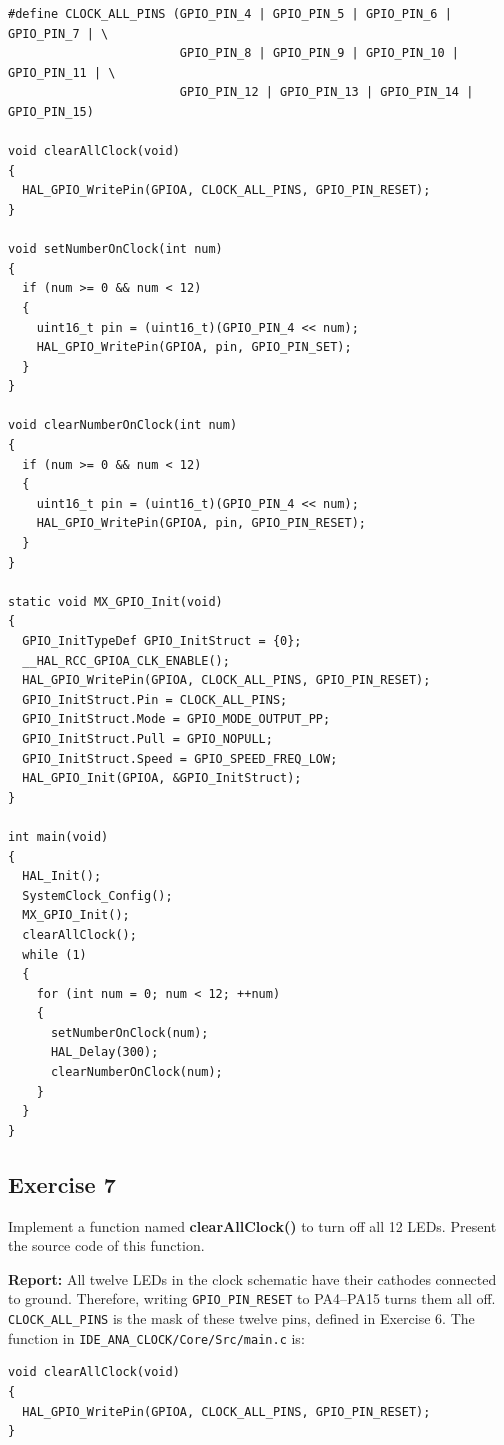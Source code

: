 \begin{lstlisting}[basicstyle=\ttfamily\small,caption={Exercise 6: GPIO initialization and sequential test of the 12 clock LEDs}]
#define CLOCK_ALL_PINS (GPIO_PIN_4 | GPIO_PIN_5 | GPIO_PIN_6 | GPIO_PIN_7 | \
                        GPIO_PIN_8 | GPIO_PIN_9 | GPIO_PIN_10 | GPIO_PIN_11 | \
                        GPIO_PIN_12 | GPIO_PIN_13 | GPIO_PIN_14 | GPIO_PIN_15)

void clearAllClock(void)
{
  HAL_GPIO_WritePin(GPIOA, CLOCK_ALL_PINS, GPIO_PIN_RESET);
}

void setNumberOnClock(int num)
{
  if (num >= 0 && num < 12)
  {
    uint16_t pin = (uint16_t)(GPIO_PIN_4 << num);
    HAL_GPIO_WritePin(GPIOA, pin, GPIO_PIN_SET);
  }
}

void clearNumberOnClock(int num)
{
  if (num >= 0 && num < 12)
  {
    uint16_t pin = (uint16_t)(GPIO_PIN_4 << num);
    HAL_GPIO_WritePin(GPIOA, pin, GPIO_PIN_RESET);
  }
}

static void MX_GPIO_Init(void)
{
  GPIO_InitTypeDef GPIO_InitStruct = {0};
  __HAL_RCC_GPIOA_CLK_ENABLE();
  HAL_GPIO_WritePin(GPIOA, CLOCK_ALL_PINS, GPIO_PIN_RESET);
  GPIO_InitStruct.Pin = CLOCK_ALL_PINS;
  GPIO_InitStruct.Mode = GPIO_MODE_OUTPUT_PP;
  GPIO_InitStruct.Pull = GPIO_NOPULL;
  GPIO_InitStruct.Speed = GPIO_SPEED_FREQ_LOW;
  HAL_GPIO_Init(GPIOA, &GPIO_InitStruct);
}

int main(void)
{
  HAL_Init();
  SystemClock_Config();
  MX_GPIO_Init();
  clearAllClock();
  while (1)
  {
    for (int num = 0; num < 12; ++num)
    {
      setNumberOnClock(num);
      HAL_Delay(300);
      clearNumberOnClock(num);
    }
  }
}
\end{lstlisting}

\subsection{Exercise 7}
Implement a function named \textbf{clearAllClock()} to turn off all 12 LEDs. Present the source code of this function.

\textbf{Report: } All twelve LEDs in the clock schematic have their cathodes connected to ground. Therefore, writing \texttt{GPIO\_PIN\_RESET} to PA4--PA15 turns them all off. \texttt{CLOCK\_ALL\_PINS} is the mask of these twelve pins, defined in Exercise 6. The function in \texttt{IDE\_ANA\_CLOCK/Core/Src/main.c} is:

\begin{lstlisting}[caption={Exercise 7: turn off all 12 clock LEDs}]
void clearAllClock(void)
{
  HAL_GPIO_WritePin(GPIOA, CLOCK_ALL_PINS, GPIO_PIN_RESET);
}
\end{lstlisting}


